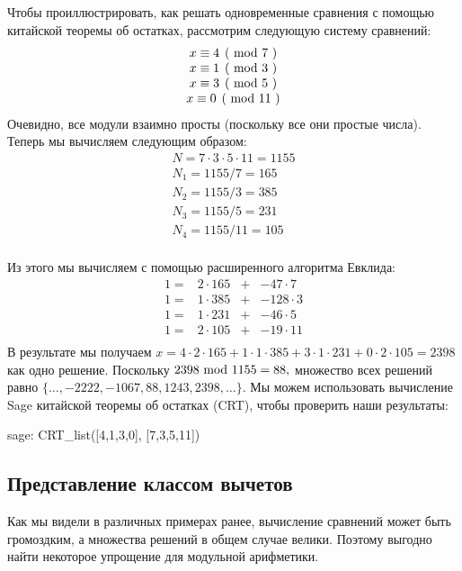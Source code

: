 \begin{example} Чтобы проиллюстрировать, как решать одновременные сравнения с помощью китайской теоремы об остатках, рассмотрим следующую систему сравнений:
$$
\begin{array}{c}
\kongru{x}{4}{7} \\
\kongru{x}{1}{3} \\
\kongru{x}{3}{5} \\
\kongru{x}{0}{11} \\
\end{array}
$$
Очевидно, все модули взаимно просты (поскольку все они простые числа).  Теперь мы вычисляем следующим образом: 
$$
\begin{array}{l}
N = 7 \cdot 3 \cdot 5 \cdot 11 = 1155\\
N_1 = 1155/7 = 165\\
N_2 = 1155/3 = 385\\
N_3 = 1155/5 = 231\\
N_4 = 1155/11 = 105\\
\end{array}
$$

Из этого мы вычисляем с помощью расширенного алгоритма Евклида:
$$
\begin{array}{cccc}
 1 = & 2 \cdot 165  & + & -47 \cdot 7 \\
 1 = & 1 \cdot 385  & + &  -128 \cdot 3 \\
 1 = & 1 \cdot 231  & + &  -46 \cdot 5 \\
 1 = & 2 \cdot 105  & + &  -19 \cdot 11 \\
\end{array}
$$
В результате мы получаем $x = 4 \cdot 2 \cdot 165 + 1 \cdot 1 \cdot 385 + 3 \cdot 1 \cdot 231 + 0 \cdot 2 \cdot 105 = 2398$
как одно решение. Поскольку $ 2398 \text{ mod } 1155 = 88, $ множество всех решений равно
$ \{\ldots, -2222, -1067,88,1243, 2398, \ldots \} $. Мы можем использовать вычисление Sage китайской теоремы об остатках (CRT), чтобы проверить наши результаты:
\begin{sagecommandline}
sage: CRT_list([4,1,3,0], [7,3,5,11])
\end{sagecommandline}
\end{example}

\subsection{Представление классом вычетов}
\label{def:remainder_class_representation}
Как мы видели в различных примерах ранее, вычисление сравнений может быть громоздким, а множества решений в общем случае велики. Поэтому выгодно найти некоторое упрощение для модульной арифметики.

